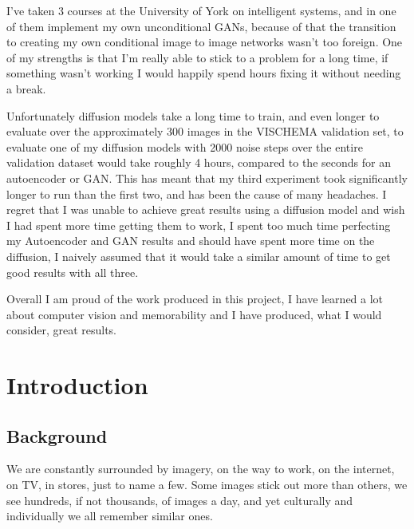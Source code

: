 \documentclass{UoYCSproject}
\begin{document}
I've taken 3 courses at the University of York on intelligent systems, and in one of them implement my own unconditional GANs, because of that the transition to creating my own conditional image to image networks wasn't too foreign. One of my strengths is that I'm really able to stick to a problem for a long time, if something wasn't working I would happily spend hours fixing it without needing a break.  

Unfortunately diffusion models take a long time to train, and even longer to evaluate over the approximately 300 images in the VISCHEMA validation set, to evaluate one of my diffusion models with 2000 noise steps over the entire validation dataset would take roughly 4 hours, compared to the seconds for an autoencoder or GAN. This has meant that my third experiment took significantly longer to run than the first two, and has been the cause of many headaches. I regret that I was unable to achieve great results using a diffusion model and wish I had spent more time getting them to work, I spent too much time perfecting my Autoencoder and GAN results and should have spent more time on the diffusion, I naively assumed that it would take a similar amount of time to get good results with all three.


Overall I am proud of the work produced in this project, I have learned a lot about computer vision and memorability and I have produced, what I would consider, great results.

\chapter{Introduction}


\section{Background}


We are constantly surrounded by imagery, on the way to work, on the internet, on TV, in stores, just to name a few. Some images stick out more than others, we see hundreds, if not thousands, of images a day, and yet culturally and individually we all remember similar ones. 
\end{document}
